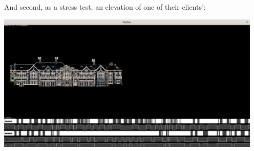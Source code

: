 \documentclass{article}
\begin{document}
And second, as a stress test, an elevation of one of their clients':

\begin{center}
  \includegraphics[width=5in]{elev.png}
\end{center}
\end{document}
